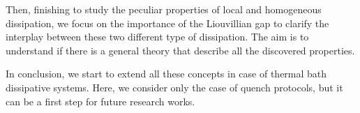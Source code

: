 Then, finishing to study the peculiar properties of local and homogeneous dissipation, we focus on the importance
of the Liouvillian gap to clarify the interplay between these two different type of dissipation. The aim is
to understand if there is a general theory that describe all the discovered properties.

In conclusion, we start to extend all these concepts in case of thermal bath dissipative systems. Here, we 
consider only the case of quench protocols, but it can be a first step for future research works. 










